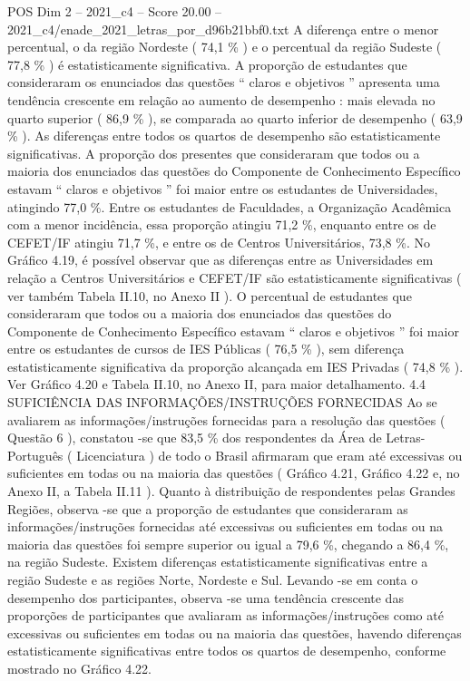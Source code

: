 \begin{textsample}{POS Dim 2 – 2021\_c4 – Score 20.00 – 2021\_c4/enade\_2021\_letras\_por\_d96b21bbf0.txt}
A diferença entre o menor percentual, o da região Nordeste ( 74,1 \% ) e o percentual da região Sudeste ( 77,8 \% ) é estatisticamente significativa.
A proporção de estudantes que consideraram os enunciados das questões “ claros e objetivos ” apresenta uma tendência crescente em relação ao aumento de desempenho : mais elevada no quarto superior ( 86,9 \% ), se comparada ao quarto inferior de desempenho ( 63,9 \% ).
As diferenças entre todos os quartos de desempenho são estatisticamente significativas.
A proporção dos presentes que consideraram que todos ou a maioria dos enunciados das questões do Componente de Conhecimento Específico estavam “ claros e objetivos ” foi maior entre os estudantes de Universidades, atingindo 77,0 \%.
Entre os estudantes de Faculdades, a Organização Acadêmica com a menor incidência, essa proporção atingiu 71,2 \%, enquanto entre os de CEFET/IF atingiu 71,7 \%, e entre os de Centros Universitários, 73,8 \%.
No Gráfico 4.19, é possível observar que as diferenças entre as Universidades em relação a Centros Universitários e CEFET/IF são estatisticamente significativas ( ver também Tabela II.10, no Anexo II ).
O percentual de estudantes que consideraram que todos ou a maioria dos enunciados das questões do Componente de Conhecimento Específico estavam “ claros e objetivos ” foi maior entre os estudantes de cursos de IES Públicas ( 76,5 \% ), sem diferença estatisticamente significativa da proporção alcançada em IES Privadas ( 74,8 \% ).
Ver Gráfico 4.20 e Tabela II.10, no Anexo II, para maior detalhamento. 4.4 SUFICIÊNCIA DAS INFORMAÇÕES/INSTRUÇÕES FORNECIDAS Ao se avaliarem as informações/instruções fornecidas para a resolução das questões ( Questão 6 ), constatou -se que 83,5 \% dos respondentes da Área de Letras-Português ( Licenciatura ) de todo o Brasil afirmaram que eram até excessivas ou suficientes em todas ou na maioria das questões ( Gráfico 4.21, Gráfico 4.22 e, no Anexo II, a Tabela II.11 ).
Quanto à distribuição de respondentes pelas Grandes Regiões, observa -se que a proporção de estudantes que consideraram as informações/instruções fornecidas até excessivas ou suficientes em todas ou na maioria das questões foi sempre superior ou igual a 79,6 \%, chegando a 86,4 \%, na região Sudeste.
Existem diferenças estatisticamente significativas entre a região Sudeste e as regiões Norte, Nordeste e Sul.
Levando -se em conta o desempenho dos participantes, observa -se uma tendência crescente das proporções de participantes que avaliaram as informações/instruções como até excessivas ou suficientes em todas ou na maioria das questões, havendo diferenças estatisticamente significativas entre todos os quartos de desempenho, conforme mostrado no Gráfico 4.22.

\end{textsample}
